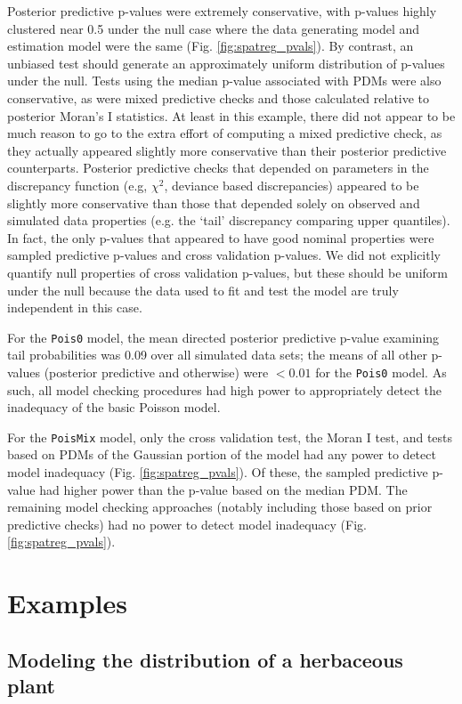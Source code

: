 \documentclass[12pt,english]{article}
\begin{document}
\begin{spacing}{1.9}
Posterior predictive p-values were extremely conservative, with p-values highly clustered near 0.5 under the null case where the data generating model and estimation model were the same (Fig. \ref{fig:spatreg_pvals}).  By contrast, an unbiased test should generate an approximately uniform distribution of p-values under the null.  Tests using the median p-value associated with PDMs were also conservative, as were mixed predictive checks and those calculated relative to posterior Moran's I statistics.  At least in this example, there did not appear to be much reason to go to the extra effort of computing a mixed predictive check, as they actually appeared slightly more conservative than their posterior predictive counterparts.  Posterior predictive checks that depended on parameters in the discrepancy function (e.g, $\chi^2$, deviance based discrepancies) appeared to be slightly more conservative than those that depended solely on observed and simulated data properties (e.g. the `tail' discrepancy comparing upper quantiles).  In fact, the only p-values that appeared to have good nominal properties were sampled predictive p-values and cross validation p-values.  We did not explicitly quantify null properties of cross validation p-values, but these should be uniform under the null because the data used to fit and test the model are truly independent in this case.  

For the \texttt{Pois0} model, the mean directed posterior predictive p-value examining tail probabilities was 0.09 over all simulated data sets; the means of all other p-values (posterior predictive and otherwise) were $<0.01$ for the \texttt{Pois0} model.  As such, all model checking procedures had high power to appropriately detect the inadequacy of the basic Poisson model.

For the \texttt{PoisMix} model, only the cross validation test, the Moran I test, and tests based on PDMs of the Gaussian portion of the model had any power to detect model inadequacy (Fig. \ref{fig:spatreg_pvals}).  Of these, the sampled predictive p-value had higher power than the p-value based on the median PDM.  The remaining model checking approaches (notably including those based on prior predictive checks) had no power to detect model inadequacy (Fig. \ref{fig:spatreg_pvals}).


\section{Examples}


\subsection{Modeling the distribution of a herbaceous plant}


\end{spacing}
\end{document}
